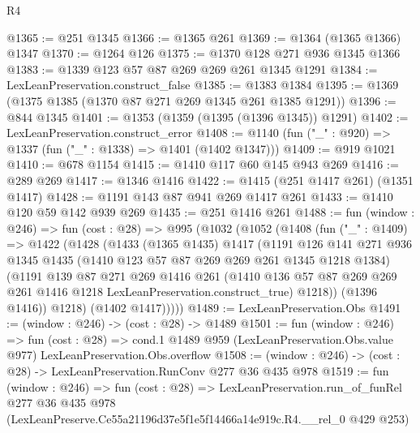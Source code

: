 \begin{lexlean}{R4}
\begin{coremodule}
@1365 := @251 @1345
@1366 := @1365 @261
@1369 := @1364 (@1365 @1366) @1347
@1370 := @1264 @126
@1375 := @1370 @128 @271 @936 @1345 @1366
@1383 := @1339 @123 @57 @87 @269 @269 @261 @1345 @1291
@1384 := LexLeanPreservation.construct_false
@1385 := @1383 @1384
@1395 := @1369 (@1375 @1385 (@1370 @87 @271 @269 @1345 @261 @1385 @1291))
@1396 := @844 @1345
@1401 := @1353 (@1359 (@1395 (@1396 @1345)) @1291)
@1402 := LexLeanPreservation.construct_error
@1408 := @1140 (fun ("_" : @920) => @1337 (fun ("_" : @1338) => @1401 (@1402 @1347)))
@1409 := @919 @1021
@1410 := @678 @1154
@1415 := @1410 @117 @60 @145 @943 @269
@1416 := @289 @269
@1417 := @1346 @1416
@1422 := @1415 (@251 @1417 @261) (@1351 @1417)
@1428 := @1191 @143 @87 @941 @269 @1417 @261
@1433 := @1410 @120 @59 @142 @939 @269
@1435 := @251 @1416 @261
@1488 := fun (window : @246) =>
  fun (cost : @28) =>
  @995
    (@1032
      (@1052
        (@1408
          (fun ("_" : @1409) =>
          @1422
            (@1428
              (@1433
                (@1365 @1435)
                @1417
                (@1191
                  @126
                  @141
                  @271
                  @936
                  @1345
                  @1435
                  (@1410 @123 @57 @87 @269 @269 @261 @1345 @1218 @1384)
                  (@1191
                    @139
                    @87
                    @271
                    @269
                    @1416
                    @261
                    (@1410
                      @136
                      @57
                      @87
                      @269
                      @269
                      @261
                      @1416
                      @1218
                      LexLeanPreservation.construct_true)
                    @1218))
                (@1396 @1416))
              @1218)
            (@1402 @1417)))))
@1489 := LexLeanPreservation.Obs
@1491 := (window : @246) -> (cost : @28) -> @1489
@1501 := fun (window : @246) =>
  fun (cost : @28) =>
  cond.{1} @1489 @959 (LexLeanPreservation.Obs.value @977) LexLeanPreservation.Obs.overflow
@1508 := (window : @246) -> (cost : @28) -> LexLeanPreservation.RunConv @277 @36 @435 @978
@1519 := fun (window : @246) =>
  fun (cost : @28) =>
  LexLeanPreservation.run_of_funRel
    @277
    @36
    @435
    @978
    (LexLeanPreserve.Ce55a21196d37e5f1e5f14466a14e919c.R4.__rel_0 @429 @253)
\end{coremodule}
\end{lexlean}

